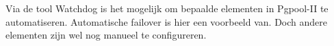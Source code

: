 Via de tool Watchdog is het mogelijk om bepaalde elementen in Pgpool-II te automatiseren. Automatische failover is hier een voorbeeld van. Doch andere elementen zijn wel nog manueel te configureren.


\subsubsection{}
\label{subsubsec:Grafische interface}

\subsubsection{}
\label{subsubsec:Manuele interventie}


